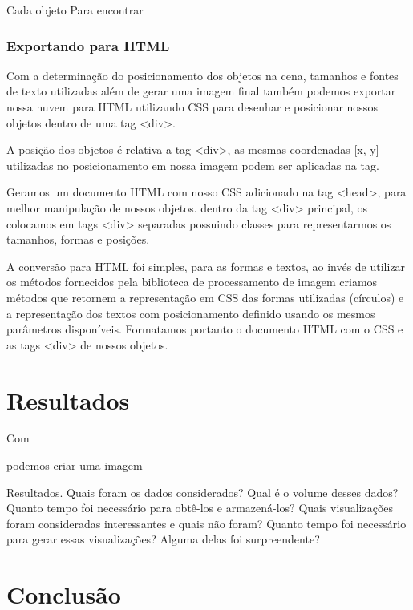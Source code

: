 \documentclass[12pt]{article}
\begin{document}
Cada objeto 
Para encontrar




\subsubsection{Exportando para HTML}

Com a determinação do posicionamento dos objetos na cena, tamanhos e fontes de texto utilizadas além de gerar uma imagem final também podemos exportar nossa nuvem para HTML utilizando CSS para desenhar e posicionar nossos objetos dentro de uma tag <div>.

A posição dos objetos é relativa a tag <div>, as mesmas coordenadas [x, y] utilizadas no posicionamento em nossa imagem podem ser aplicadas na tag.

Geramos um documento HTML com nosso CSS adicionado na tag <head>, para melhor manipulação de nossos objetos. dentro da tag <div> principal, os colocamos em tags <div> separadas possuindo classes para representarmos os tamanhos, formas e posições.

A conversão para HTML foi simples, para as formas e textos, ao invés de utilizar os métodos fornecidos pela biblioteca de processamento de imagem criamos métodos que retornem a representação em CSS das formas utilizadas (círculos) e a representação dos textos com posicionamento definido usando os mesmos parâmetros disponíveis. 
Formatamos portanto o documento HTML com o CSS e as tags <div> de nossos objetos.







\section{Resultados}

Com 





podemos criar uma imagem

Resultados.
Quais foram os dados considerados? Qual é o volume desses dados? Quanto tempo foi
necessário para obtê-los e armazená-los? Quais visualizações foram consideradas interessantes e quais não
foram? Quanto tempo foi necessário para gerar essas visualizações? Alguma delas foi surpreendente?


\section{Conclusão}



\begin{thebibliography}{2}

\end{thebibliography}
\end{document}
